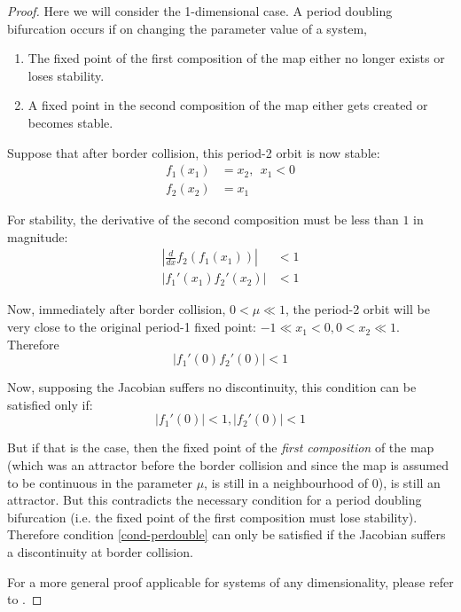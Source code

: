 \documentclass[oneside]{book}
\renewcommand{\(}{\begin{columns}}
\renewcommand{\)}{\end{columns}}
\newcommand{\<}[1]{\begin{column}{#1}}
\renewcommand{\>}{\end{column}}
\begin{document}
\begin{proof}


Here we will consider the 1-dimensional case. A period doubling bifurcation occurs if on changing the parameter value of a system,
\begin{enumerate}
\item The fixed point of the first composition of the map either no longer 
exists or loses stability.  
\item A fixed point in the second composition of the map either gets created 
or becomes stable.  
\end{enumerate}

Suppose that after border collision, this period-2 orbit is now stable:
\begin{align*}
f_1(x_1)&=x_2,~~x_1<0\\
f_2(x_2)&=x_1
\end{align*}

For stability, the derivative of the second composition must be less than $1$ in magnitude:
\begin{align*}
\left|\frac{d}{dx}f_2(f_1(x_1))\right|&<1\\
\left|f_1'(x_1)f_2'(x_2)\right|&<1
\end{align*}

Now, immediately after border collision, $0<\mu\ll 1$, the period-2 orbit will be 
very close to the original period-1 fixed point: $-1\ll x_1<0, 0<x_2\ll 1$.  Therefore
\[
\left|f_1'(0)f_2'(0)\right|<1
\]

Now, supposing the Jacobian suffers no discontinuity, this condition can be 
satisfied only if:
\begin{equation}
\label{cond-perdouble}
\left|f_1'(0)\right|<1, \left|f_2'(0)\right|<1
\end{equation}


But if that is the case, then the fixed point of the \emph{first composition} 
of the map (which was an attractor before the border collision and since the 
map is assumed to be continuous in the parameter $\mu$, is still in a 
neighbourhood of $0$), is still an attractor.  But this contradicts the 
necessary condition for a period doubling bifurcation (i.e. the fixed point of 
the first composition must lose stability). Therefore condition 
\eqref{cond-perdouble} can only be satisfied if the Jacobian suffers a 
discontinuity at border collision.  


For a more general proof applicable for systems of any dimensionality, please 
refer to \cite{feigin-1999}.

\end{proof}
\end{document}
